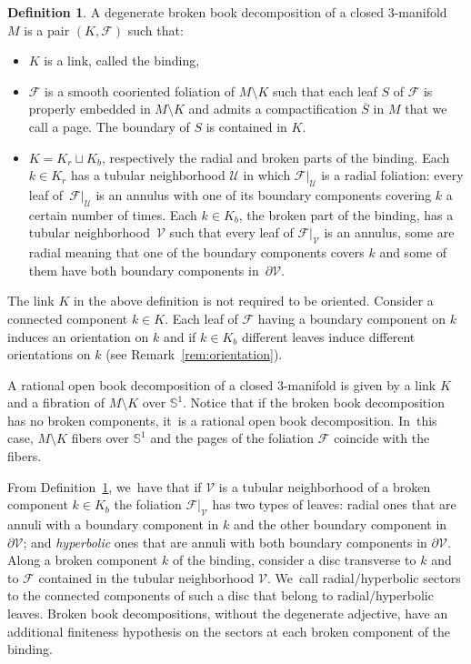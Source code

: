 \documentclass[11pt]{article}
\newcommand{\threemanifold}{$3$\nobreakdash-mani\-fold\xspace}
\theoremstyle{definition}
\newtheorem{defi}[theorem]{Definition}
\newcommand{\mS}{\mathbb{S}}
\begin{document}
\begin{defi}\label{defn:BBD}
A degenerate broken book decomposition of a closed \threemanifold~$M$ is a pair $(K,\mathcal{F})$ such that:
\begin{itemize}
\item
$K$ is a link, called the binding,
\item
$\mathcal{F}$ is a smooth cooriented foliation of $M\setminus K$ such that each leaf $S$ of $\mathcal{F}$ is properly embedded in $M\setminus K$ and admits a compactification $\overline{S}$ in $M$ that we call a page. The boundary of $S$ is contained in $K$.
\item
$K=K_r\sqcup K_b$, respectively the radial and broken parts of the binding. Each $k\in K_r$ has a tubular neighborhood $\mathcal{U}$ in which $\mathcal{F}|_{\mathcal U}$ is a radial foliation: every leaf of~$\mathcal{F}|_{\mathcal U}$ is an annulus with one of its boundary components covering $k$ a certain number of times. Each $k\in K_b$, the broken part of the binding, has a tubular neighborhood~$\mathcal{V}$ such that every leaf of $\mathcal{F}|_{\mathcal{V}}$ is an annulus, some are radial meaning that one of the boundary components covers $k$ and some of them have both boundary components in~$\partial \mathcal{V}$.
\end{itemize}
\end{defi}

The link $K$ in the above definition is not required to be oriented. Consider a connected component $k\in K$. Each leaf of $\mathcal{F}$ having a boundary component on $k$ induces an orientation on $k$ and if $k\in K_b$ different leaves induce different orientations on $k$ (see Remark~\ref{rem:orientation}).

A rational open book decomposition of a closed \threemanifold is given by a link $K$ and a fibration of $M\setminus K$ over $\mathbb{S}^1$. Notice that if the broken book decomposition has no broken components, it~is a rational open book decomposition. In~this case, $M\setminus K$ fibers over $\mS^1$ and the pages of the foliation $\mathcal{F}$ coincide with the fibers.

From Definition~\ref{defn:BBD}, we~have that if $\mathcal{V}$ is a tubular neighborhood of a broken component $k\in K_b$ the foliation $\mathcal{F}|_{\mathcal{V}}$ has two types of leaves: radial ones that are annuli with a boundary component in $k$ and the other boundary component in $\partial {\mathcal{V}}$; and \emph{hyperbolic} ones that are annuli with both boundary components in $\partial {\mathcal{V}}$.
Along a broken component $k$ of the binding, consider a disc transverse to $k$ and to $\mathcal{F}$ contained in the tubular neighborhood $\mathcal V$. We~call radial/hyperbolic sectors to the connected components of such a disc that belong to radial/hyperbolic leaves. Broken book decompositions, without the degenerate adjective, have an additional finiteness hypothesis on the sectors at each broken component of the binding.
\end{document}
